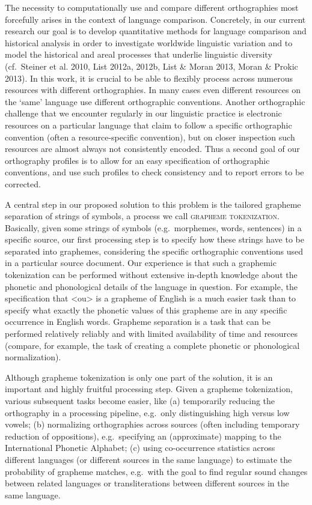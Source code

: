 The necessity to computationally use and compare different orthographies most forcefully arises in the context of language comparison. Concretely, in our current research our goal is to develop quantitative methods for language comparison and historical analysis in order to investigate worldwide linguistic variation and to model the historical and areal processes that underlie linguistic diversity (cf.~Steiner et al. 2010, List 2012a, 2012b, List \& Moran 2013, Moran \& Prokic 2013). In this work, it is crucial to be able to flexibly process across numerous resources with different orthographies. In many cases even different resources on the `same' language use different orthographic conventions. Another orthographic challenge that we encounter regularly in our linguistic practice is electronic resources on a particular language that claim to follow a specific orthographic convention (often a resource-specific convention), but on closer inspection such resources are almost always not consistently encoded. Thus a second goal of our orthography profiles is to allow for an easy specification of orthographic conventions, and use such profiles to check consistency and to report errors to be corrected.

A central step in our proposed solution to this problem is the tailored grapheme separation of strings of symbols, a process we call \textsc{grapheme tokenization}. Basically, given some strings of symbols (e.g.~morphemes, words, sentences) in a specific source, our first processing step is to specify how these strings have to be separated into graphemes, considering the specific orthographic conventions used in a particular source document. Our experience is that such a graphemic tokenization can be performed without extensive in-depth knowledge about the phonetic and phonological details of the language in question. For example, the specification that <ou> is a grapheme of English is a much easier task than to specify what exactly the phonetic values of this grapheme are in any specific occurrence in English words. Grapheme separation is a task that can be performed relatively reliably and with limited availability of time and resources (compare, for example, the task of creating a complete phonetic or phonological normalization).

Although grapheme tokenization is only one part of the solution, it is an important and highly fruitful processing step. Given a grapheme tokenization, various subsequent tasks become easier, like (a) temporarily reducing the orthography in a processing pipeline, e.g.~only distinguishing high versus low vowels; (b) normalizing orthographies across sources (often including temporary reduction of oppositions), e.g.~specifying an (approximate) mapping to the International Phonetic Alphabet; (c) using co-occurrence statistics across different languages (or different sources in the same language) to estimate the probability of grapheme matches, e.g.~with the goal to find regular sound changes between related languages or transliterations between different sources in the same language.

